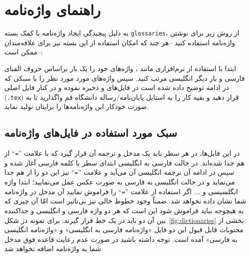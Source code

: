 {{{    
    
    \section{راهنمای واژه‌نامه}

    به دلیل پیچیدگی ایجاد واژه‌نامه‌ با کمک بسته \Verb+glossaries+، از روش زیر برای نوشتن واژه‌نامه استفاده کنید --هر چند که امکان استفاده از این 
    بسته نیز برای علاقه‌مندان ممکن است--:

    ابتدا با استفاده از نرم‌افزاری مانند ، واژه‌‌های خود را یک‌ بار براساس حروف الفبای فارسی و بار دیگر انگلیسی مرتب کنید. 
    سپس واژه‌های مورد مورد نظر  را با سبکی که در ادامه توضیح داده شده است در فایل‌های
     و   
    ذخیره نموده و در کنار فایل اصلی (\texttt{\jobname.tex}) قرار دهید و بقیه کار را به استایل پایان‌نامه/رساله دانشگاه قم واگذارید تا به صورت 
    خودکار این واژه‌نامه‌ها را برایتان تولید نماید. 
    
    \subsection{سبک مورد استفاده در فایل‌های واژه‌نامه}
    در این فایل‌ها، در هر سطر باید یک مدخل و ترجمه آن قرار گیرد که با علامت ''\Verb+=+`` از هم جدا شده‌اند. 
    در حالت فارسی به انگليسی ابتدای سطر با کلمه فارسی آغاز شده و سپس در ادامه آن ترجمه انگلیسی آن می‌آید و علامت ''\Verb+=+`` نیز  این دو را 
    از هم جدا می‌نماید و در حالت انگليسی به فارسی به صورت عکس عمل می‌نمایید؛ ابتدا واژه انگلسیسی و \ldots. 
    اگر استفاده از علامت  ''\Verb+=+``  را فراموش نمایید آن مدخل در واژه‌نامه شما نشان داده نخواهد شد. ضمناً وجود خطوط خالی نیز 
    بی‌تاثیر است امّا آن چیزی که به هیچوجه نباید فراموش شود این است که هر دو واژه فارسی و انگلیسی و جداکننده بین آن دو باید در یک خط قرار گیرند. 
    برای نمونه در شکل~\ref{fig:dictionaries} 
    بخشی از محتویات قابل 
    قبول این دو فایل «واژه‌نامه فارسی به انگليسی» و «واژه‌نامه انگليسی به فارسی» آمده است.  توجه داشته باشید در صورت عدم رعایت قاعده فوق مدخل شما 
    به واژه‌نامه اضافه نخواهد شد. 

}}}

